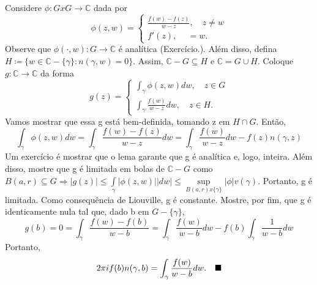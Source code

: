 \documentclass[complex.tex]{subfiles}
\begin{document}
\begin{proof*}
	Considere $\phi:GxG\rightarrow \mathbb{C}$ dada por
	$$
		\phi(z, w) = \left\{\begin{array}{ll}
			\frac{f(w)-f(z)}{w-z}, \quad z\neq{w} \\
			f'(z), \quad \ = w.
		\end{array}\right.
	$$
	Observe que $\phi(\cdot, w):G\rightarrow \mathbb{C}$ é analítica (Exercício.). Além disso, defina
	$H\coloneqq \{w\in{\mathbb{C}-\{\gamma\}}: n(\gamma, w) = 0\}$. Assim, $\mathbb{C}-G\subseteq{H}\text{ e } \mathbb{C} = G\cup{H}$.
	Coloque $g:\mathbb{C}\rightarrow \mathbb{C}$ da forma
	$$
		g(z) = \left\{\begin{array}{ll}
			\int_{\gamma}^{}\phi(z, w)dw, \quad z\in{G} \\
			\int_{\gamma}^{}\frac{f(w)}{w-z}dw, \quad z\in{H}.
		\end{array}\right.
	$$
	Vamos mostrar que essa g está bem-definida, tomando z em $H\cap{G}.$ Então,
	$$
		\int_{\gamma}^{}\phi(z, w)dw = \int_{\gamma}^{}\frac{f(w)-f(z)}{w-z}dw = \int_{\gamma}^{}\frac{f(w)}{w-z}dw - f(z)n(\gamma, z)
	$$
	Um exercício é mostrar que o lema garante que g é analítica e, logo, inteira. Além disso, mostre que g é limitada em
	bolas de $\mathbb{C}-G$ como $B(a, r)\subseteq{G}\Rightarrow |g(z)|\leq \int\limits_{\gamma}|\phi(z, w)||dw|\leq \sup\limits_{B(a, r)x \{\gamma\} }|\phi|v(\gamma)$.
	Portanto, g é limitada. Como consequência de Liouville, g é constante. Mostre, por fim, que g é identicamente nula tal que, dado b em
	$G-\{\gamma\}$,
	$$
		g(b) = 0 = \int_{\gamma}^{}\frac{f(w) - f(b)}{w-b} = \int_{\gamma}^{}\frac{f(w)}{w-b}dw - f(b) \int_{\gamma}^{}\frac{1}{w-b}dw
	$$
	Portanto,
	$$
		2\pi if(b)n(\gamma, b) = \int_{\gamma}^{}\frac{f(w)}{w-b}dw. \quad\text{$\blacksquare$}
	$$
\end{proof*}
\end{document}
